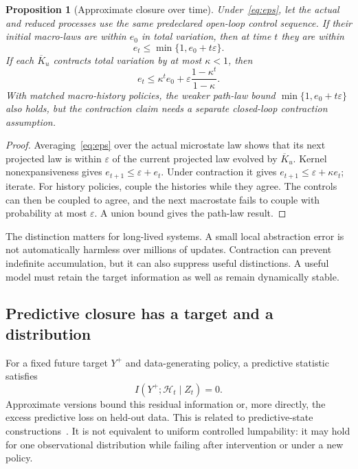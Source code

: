 \documentclass[11pt,letterpaper]{article}
\theoremstyle{plain}
\newtheorem{proposition}{Proposition}[section]
\theoremstyle{definition}
\theoremstyle{remark}
\newcommand{\Hist}{\mathcal H}
\begin{document}
\begin{proposition}[Approximate closure over time]\label{prop:time}
Under~\eqref{eq:eps}, let the actual and reduced processes use the same predeclared open-loop control sequence. If their initial macro-laws are within $e_0$ in total variation, then at time $t$ they are within
\[
e_t\leq\min\{1,e_0+t\varepsilon\}.
\]
If each $\overline K_u$ contracts total variation by at most $\kappa<1$, then
\begin{equation}\label{eq:contract}
e_t\leq\kappa^t e_0+\varepsilon\frac{1-\kappa^t}{1-\kappa}.
\end{equation}
With matched macro-history policies, the weaker path-law bound $\min\{1,e_0+t\varepsilon\}$ also holds, but the contraction claim needs a separate closed-loop contraction assumption.
\end{proposition}
\begin{proof}
Averaging~\eqref{eq:eps} over the actual microstate law shows that its next projected law is within $\varepsilon$ of the current projected law evolved by $\overline K_u$. Kernel nonexpansiveness gives $e_{t+1}\leq\varepsilon+e_t$. Under contraction it gives $e_{t+1}\leq\varepsilon+\kappa e_t$; iterate. For history policies, couple the histories while they agree. The controls can then be coupled to agree, and the next macrostate fails to couple with probability at most $\varepsilon$. A union bound gives the path-law result.
\end{proof}

The distinction matters for long-lived systems. A small local abstraction error is not automatically harmless over millions of updates. Contraction can prevent indefinite accumulation, but it can also suppress useful distinctions. A useful model must retain the target information as well as remain dynamically stable.

\subsection{Predictive closure has a target and a distribution}
For a fixed future target $Y^+$ and data-generating policy, a predictive statistic satisfies
\[
I(Y^+;\Hist_t\mid Z_t)=0.
\]
Approximate versions bound this residual information or, more directly, the excess predictive loss on held-out data. This is related to predictive-state constructions~\cite{shalizi}. It is not equivalent to uniform controlled lumpability: it may hold for one observational distribution while failing after intervention or under a new policy.
\end{document}
